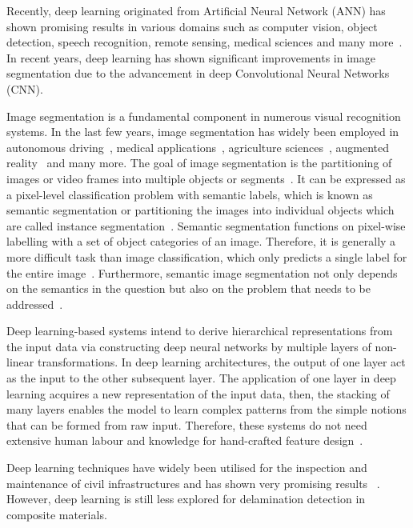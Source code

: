 Recently, deep learning originated from Artificial Neural Network (ANN) has shown promising results in various domains such as computer vision, object detection, speech recognition, remote sensing, medical sciences and many more~\cite{deng2014deep, mohanty2016using, zhang2020well, pashaei2020review}. 
In recent years, deep learning has shown significant improvements in image segmentation due to the advancement in deep Convolutional Neural Networks (CNN). 

Image segmentation is a fundamental component in numerous visual recognition systems. 
In the last few years, image segmentation has widely been employed in autonomous driving~\cite{zhang2013understanding, cordts2016cityscapes, ros2016synthia, li2018real}, medical applications~\cite{taghanaki2020deep}, agriculture sciences~\cite{milioto2018real}, augmented reality~\cite{miksik2015semantic} and many more. 
The goal of image segmentation is the partitioning of images or video frames into multiple objects or segments~\cite{szeliski2010computer}. 
It can be expressed as a pixel-level classification problem with semantic labels, which is known as semantic segmentation or partitioning the images into individual objects which are called instance segmentation~\cite{minaee2020image}. 
Semantic segmentation functions on pixel-wise labelling with a set of object categories of an image.  
Therefore, it is generally a more difficult task than image classification, which only predicts a single label for the entire image~\cite{minaee2020image}. 
Furthermore, semantic image segmentation not only depends on the semantics in the question but also on the problem that needs to be addressed~\cite{ghosh2019understanding}.

Deep learning-based systems intend to derive hierarchical representations from the input data via constructing deep neural networks by multiple layers of non-linear transformations. 
In deep learning architectures, the output of one layer act as the input to the other subsequent layer. 
The application of one layer in deep learning acquires a new representation of the input data, then, the stacking of many layers enables the model to learn complex patterns from the simple notions that can be formed from raw input. 
Therefore, these systems do not need extensive human labour and knowledge for hand-crafted feature design~\cite{Zhao2019b, Yuan2020}.

Deep learning techniques have widely been utilised for the inspection and maintenance of civil infrastructures and has shown very promising results ~\cite{cha2017deep, lin2017structural, liu2019computer}. 
However, deep learning is still less explored for delamination detection in composite materials.   

